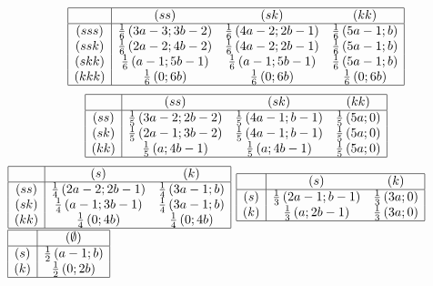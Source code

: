 \begin{problem}
\begin{sol}
\[\begin{array}{|c|ccc|}  \hline {} & {\left(ss\right)} & {\left(sk\right)} & {\left(kk\right)} \\  \hline {\left(sss\right)} & {\frac{1}{6} \left(3a-3;3b-2\right)} & {\frac{1}{6} \left(4a-2;2b-1\right)} & {\frac{1}{6} \left(5a-1;b\right)} \\ {\left(ssk\right)} & {\frac{1}{6} \left(2a-2;4b-2\right)} & {\frac{1}{6} \left(4a-2;2b-1\right)} & {\frac{1}{6} \left(5a-1;b\right)} \\ {\left(skk\right)} & {\frac{1}{6} \left(a-1;5b-1\right)} & {\frac{1}{6} \left(a-1;5b-1\right)} & {\frac{1}{6} \left(5a-1;b\right)} \\ {\left(kkk\right)} & {\frac{1}{6} \left(0;6b\right)} & {\frac{1}{6} \left(0;6b\right)} & {\frac{1}{6} \left(0;6b\right)} \\  \hline  \end{array}\]
\[\begin{array}{|c|ccc|}  \hline {} & {\left(ss\right)} & {\left(sk\right)} & {\left(kk\right)} \\  \hline {\left(ss\right)} & {\frac{1}{5} \left(3a-2;2b-2\right)} & {\frac{1}{5} \left(4a-1;b-1\right)} & {\frac{1}{5} \left(5a;0\right)} \\ {\left(sk\right)} & {\frac{1}{5} \left(2a-1;3b-2\right)} & {\frac{1}{5} \left(4a-1;b-1\right)} & {\frac{1}{5} \left(5a;0\right)} \\ {\left(kk\right)} & {\frac{1}{5} \left(a;4b-1\right)} & {\frac{1}{5} \left(a;4b-1\right)} & {\frac{1}{5} \left(5a;0\right)} \\  \hline  \end{array}\]
 $\begin{array}{|c|cc|}  \hline {} & {\left(s\right)} & {\left(k\right)} \\  \hline {\left(ss\right)} & {\frac{1}{4} \left(2a-2;2b-1\right)} & {\frac{1}{4} \left(3a-1;b\right)} \\ {\left(sk\right)} & {\frac{1}{4} \left(a-1;3b-1\right)} & {\frac{1}{4} \left(3a-1;b\right)} \\ {\left(kk\right)} & {\frac{1}{4} \left(0;4b\right)} & {\frac{1}{4} \left(0;4b\right)} \\  \hline  \end{array}$  $\begin{array}{|c|cc|}  \hline {} & {\left(s\right)} & {\left(k\right)} \\  \hline {\left(s\right)} & {\frac{1}{3} \left(2a-1;b-1\right)} & {\frac{1}{3} \left(3a;0\right)} \\ {\left(k\right)} & {\frac{1}{3} \left(a;2b-1\right)} & {\frac{1}{3} \left(3a;0\right)} \\  \hline  \end{array}$  $\begin{array}{|c|c|}  \hline {} & {\left(\emptyset \right)} \\  \hline {\left(s\right)} & {\frac{1}{2} \left(a-1;b\right)} \\ {\left(k\right)} & {\frac{1}{2} \left(0;2b\right)} \\  \hline  \end{array}$

\end{sol}
\end{problem}
